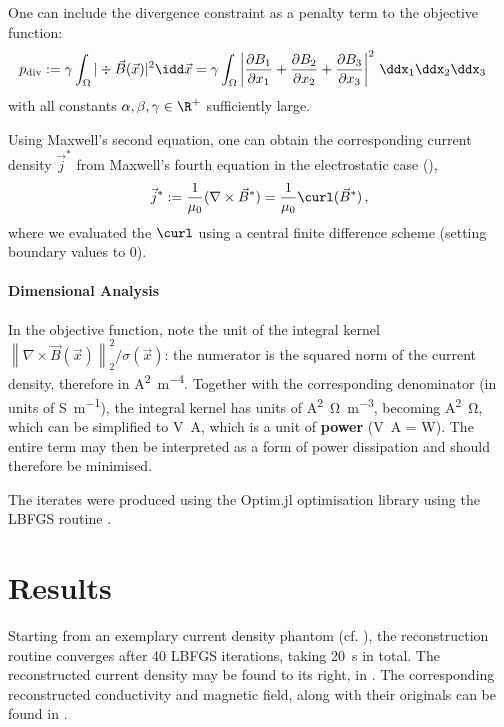 \documentclass[10pt]{article}
\newcommand{\sfrac}[2]{{#1 / #2}}
\renewcommand{\norm}[1]{\left\lVert#1\right\rVert_{\scriptscriptstyle 2}}
\begin{document}
  One can include the divergence constraint as a penalty term to the objective function:
  \begin{align*}
    p_{\rm div} := \gamma \int_\Omega |\div \vec{B}(\vec{x})|^2 \idd\vec{x} & = \gamma \int_\Omega \left|\frac{\partial B_1}{\partial x_1} + \frac{\partial B_2}{\partial x_2} + \frac{\partial B_3}{\partial x_3}\right|^2 \,\ddx_1\ddx_2\ddx_3
  \end{align*}
  with all constants $\alpha, \beta, \gamma \in \R^+$ sufficiently large.

  Using Maxwell's second equation, one can obtain the corresponding current density $\vec{j}^*$ from Maxwell's fourth equation in the electrostatic case (),
  $$\vec{j}^* := \frac{1}{\mu_0} (\nabla \times \vec{B}^*) = \frac{1}{\mu_0} \curl(\vec{B}^*)\,,$$
  where we evaluated the $\curl$ using a central finite difference scheme (setting boundary values to 0).

  \paragraph{Dimensional Analysis}
  In the objective function, note the unit of the integral kernel $\sfrac{\norm{\nabla \times \vec{B}(\vec{x})}^2}{\sigma(\vec{x})}$: the numerator is the squared norm of the current density, therefore in \unit{\ampere\squared\per\meter^4}. Together with the corresponding denominator (in units of \unit{\siemens\per\meter}), the integral kernel has units of \unit{\ampere\squared\ohm\per\meter^3}, becoming \unit{\ampere\squared\ohm}, which can be simplified to \unit{\volt\ampere}, which is a unit of \textbf{power} (\unit{\volt\ampere} = \unit{W}).
  The entire term may then be interpreted as a form of power dissipation and should therefore be minimised.

  The iterates were produced using the Optim.jl optimisation library \parencite{2018-optim-jl} using the LBFGS routine \parencite{1989-lbfgs}.

  \section{Results}
  \label{sec:results}
  Starting from an exemplary current density phantom (cf. ), the reconstruction routine converges after 40 LBFGS iterations, taking \SI{20}{\second} in total.
  The reconstructed current density may be found to its right, in .
  The corresponding reconstructed conductivity and magnetic field, along with their originals can be found in .
\end{document}
